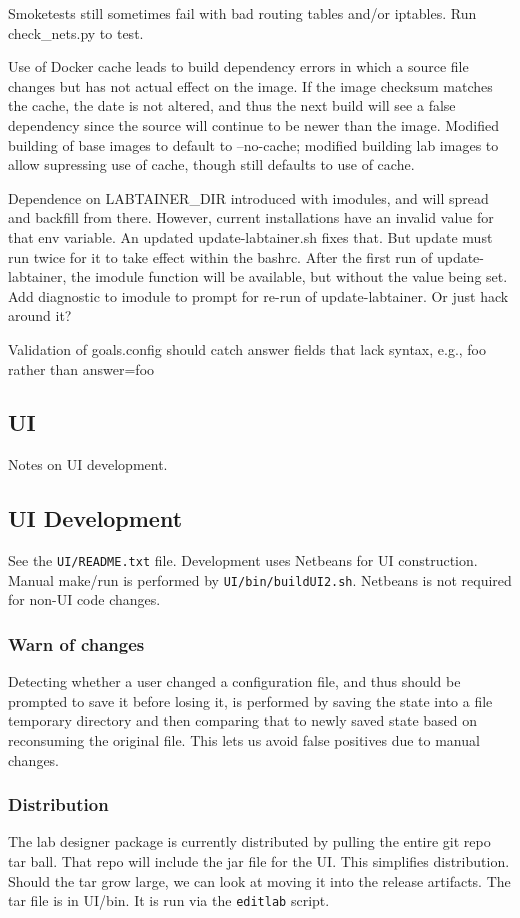 \documentclass[12pt]{article}
\begin{document}
Smoketests still sometimes fail with bad routing tables and/or iptables.  Run check\_nets.py to test.

Use of Docker cache leads to build dependency errors in which a source file changes but has not actual effect on the image.  If the image
checksum matches the cache, the date is not altered, and thus the next build will see a false dependency since the source will continue to
be newer than the image.  Modified building of base images to default to --no-cache; modified building lab images to allow supressing use of cache,
though still defaults to use of cache.

Dependence on LABTAINER\_DIR introduced with imodules, and will spread and backfill from there.  However, current installations have an invalid
value for that env variable.  An updated update-labtainer.sh fixes that.  But update must run twice for it to take effect within the bashrc.
After the first run of update-labtainer, the imodule function will be available, but without the value being set.  Add diagnostic to imodule to
prompt for re-run of update-labtainer.  Or just hack around it?

Validation of goals.config should catch answer fields that lack syntax, e.g., foo rather than answer=foo

\subsection {UI}
Notes on UI development.  
\subsection{UI Development}
See the {\tt UI/README.txt} file.  Development uses Netbeans for UI construction.  Manual make/run is performed by
{\tt UI/bin/buildUI2.sh}.  Netbeans is not required for non-UI code changes.  
\subsubsection{Warn of changes}
Detecting whether a user changed a configuration file, and thus should be prompted to save it before losing it,
is performed by saving the state into a file temporary directory and then comparing that to newly saved state based
on reconsuming the original file.  This lets us avoid false positives due to manual changes.

\subsubsection{Distribution}
The lab designer package is currently distributed by pulling the entire git repo tar ball.
That repo will include the jar file for the UI.  This simplifies distribution.  Should the tar grow large, we
can look at moving it into the release artifacts.  The tar file is in UI/bin.  It is run via the {\tt editlab}
script.
\end{document}
